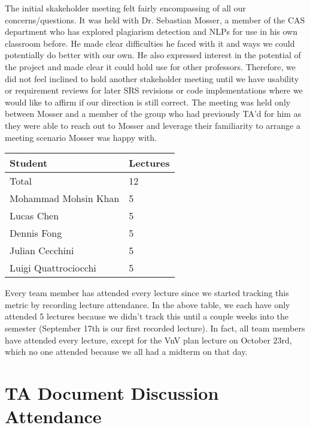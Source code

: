 \documentclass{article}
\begin{document}
The initial skakeholder meeting felt fairly encompassing of all our concerns/questions. It was held
with Dr. Sebastian Mosser, a member of the CAS department who has explored plagiarism detection and NLPs
for use in his own classroom before. He made clear difficulties he faced with it and ways we could 
potentially do better with our own. He also expressed interest in the potential of the project and made clear
it could hold use for other professors. Therefore, we did not feel inclined to hold another stakeholder meeting
until we have usability or requirement reviews for later SRS revisions or code implementations where we would
like to affirm if our direction is still correct. The meeting was held only between Mosser and a member of the 
group who had previously TA'd for him as they were able to reach out to Mosser and leverage their familiarity
to arrange a meeting scenario Mosser was happy with.

\begin{table}[H]
\centering
\begin{tabular}{ll}
\toprule
\textbf{Student} & \textbf{Lectures}\\
\midrule
Total & 12\\
Mohammad Mohsin Khan & 5\\
Lucas Chen & 5\\
Dennis Fong & 5\\
Julian Cecchini & 5\\
Luigi Quattrociocchi & 5\\
\bottomrule
\end{tabular}
\end{table}

Every team member has attended every lecture since we started tracking
this metric by recording lecture attendance. In the above table, we each
have only attended 5 lectures because we didn't track this until a couple
weeks into the semester (September 17th is our first recorded lecture).
In fact, all team members have attended every lecture, except for the
VnV plan lecture on October 23rd, which no one attended because we all
had a midterm on that day.

\section{TA Document Discussion Attendance}
\end{document}
